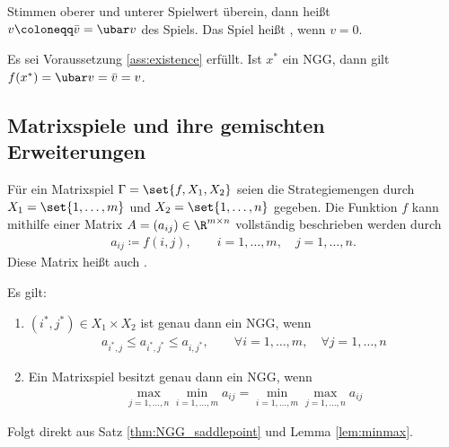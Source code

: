 \begin{definition*}
  Stimmen oberer und unterer Spielwert überein, dann heißt $v \coloneqq \bar v = \ubar v$  des Spiels. Das Spiel heißt , wenn $v = 0$. 
\end{definition*}
\begin{korollar}
  Es sei Voraussetzung \ref{ass:existence} erfüllt. Ist $x^{*}$ ein NGG, dann gilt $f(x^{*}) = \ubar v = \bar v = v$. 
\end{korollar}

\subsection{Matrixspiele und ihre gemischten Erweiterungen}
\label{sec:matrixspiele}

Für ein Matrixspiel $\Gamma= \set{f, X_{1}, X_{2}}$ seien die Strategiemengen durch $X_{1} = \set{1, \dots, m}$ und $X_{2} = \set{1, \dots, n}$ gegeben. Die Funktion $f$ kann mithilfe einer Matrix $A = (a_{ij}) \in \R^{m \times n}$ vollständig beschrieben werden durch
\begin{align*}
  a_{ij} \coloneqq f(i, j), \qquad i = 1, \dots, m, \quad j = 1, \dots , n.
\end{align*}
Diese Matrix heißt auch .
\begin{satz}
  Es gilt:
\enu{\alph}
  \begin{enumerate}
  \item $(i^{*}, j^{*})\in X_{1} \times X_{2}$ ist genau dann ein NGG, wenn
    \begin{align}\label{eq:NGG_matrix}
      a_{i^{*}, j} \leq a_{i^{*}, j^{*}} \leq a_{i, j^{*}}, \qquad \forall i = 1, \dots, m, \quad \forall j = 1, \dots, n
    \end{align}
\item Ein Matrixspiel besitzt genau dann ein NGG, wenn
  \begin{align*}
    \max_{j = 1, \dots, n} \min_{i = 1, \dots, m} a_{ij} = \min_{i = 1, \dots, m} \max_{j = 1, \dots, n} a_{ij} 
  \end{align*}
  \end{enumerate}
\end{satz}
\begin{beweis}
  Folgt direkt aus Satz \ref{thm:NGG_saddlepoint} und Lemma \ref{lem:minmax}. 
\end{beweis}

